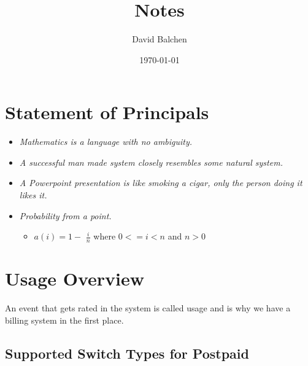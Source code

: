 \documentclass[12pt,twoside]{article}
\title{Notes}
\author{David Balchen}
\date{\today}
\begin{document}
\maketitle

\setcounter{tocdepth}{3}
\vspace*{1cm}
\pagenumbering{}
\newpage
\clearpage
\addtolength{\oddsidemargin}{-.5in}
\addtolength{\evensidemargin}{-01.25in}
\addtolength{\textwidth}{1.4in}
\addtolength{\topmargin}{-1.25in}
\addtolength{\textheight}{2.45in}
\setcounter{tocdepth}{3}
\vspace*{1cm} 
{}
\setcounter{tocdepth}{2}
\pagestyle{fancy}
\fancyhf[C]{}
\tableofcontents 
\newpage
{}
\section{Statement of Principals}
\label{sec-1}

\begin{itemize}
\item \emph{Mathematics is a language with no ambiguity.}
\item \emph{A successful man made system closely resembles some natural system.}
\item \emph{A Powerpoint presentation is like smoking a cigar, only the      person doing it likes it.}
\item \emph{Probability from a point.}
\begin{itemize}
\item $a(i) = 1-$ \Large $\frac{i}{n}$ \normalsize where $0 <= i < n$ and $n > 0$
\end{itemize}
\end{itemize}
\section{Usage Overview}
\label{sec-2}

  An event that gets rated in the system is called usage and is why we have a billing system in the first place.  
\subsection{Supported Switch Types for Postpaid}
\label{sec-2-1}
\end{document}
